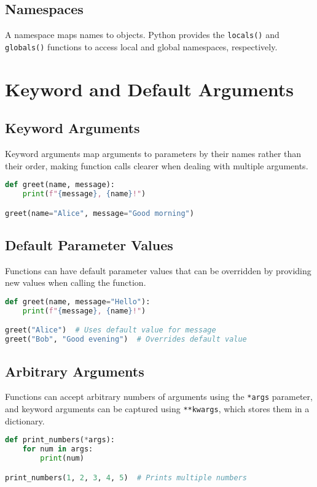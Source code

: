 \documentclass{article}
\begin{document}
\subsection{Namespaces}
A namespace maps names to objects. Python provides the \lstinline|locals()| and \lstinline|globals()| functions to access local and global namespaces, respectively.

\section{Keyword and Default Arguments}

\subsection{Keyword Arguments}
Keyword arguments map arguments to parameters by their names rather than their order, making function calls clearer when dealing with multiple arguments.

\begin{lstlisting}[language=Python, caption={Using Keyword Arguments}]
def greet(name, message):
    print(f"{message}, {name}!")

greet(name="Alice", message="Good morning")
\end{lstlisting}

\subsection{Default Parameter Values}
Functions can have default parameter values that can be overridden by providing new values when calling the function.

\begin{lstlisting}[language=Python, caption={Using Default Parameter Values}]
def greet(name, message="Hello"):
    print(f"{message}, {name}!")

greet("Alice")  # Uses default value for message
greet("Bob", "Good evening")  # Overrides default value
\end{lstlisting}

\subsection{Arbitrary Arguments}
Functions can accept arbitrary numbers of arguments using the \lstinline|*args| parameter, and keyword arguments can be captured using \lstinline|**kwargs|, which stores them in a dictionary.

\begin{lstlisting}[language=Python, caption={Arbitrary Arguments Example}]
def print_numbers(*args):
    for num in args:
        print(num)

print_numbers(1, 2, 3, 4, 5)  # Prints multiple numbers
\end{lstlisting}
\end{document}
